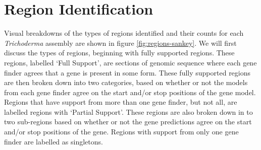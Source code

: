 \section{Region Identification}
\label{section:regions}

Visual breakdowns of the types of regions identified and their counts
for each \textit{Trichoderma} assembly are shown in figure
\ref{fig:regions-sankey}. We will first discuss the types of regions,
beginning with fully supported regions. These regions, labelled `Full
Support', are sections of genomic sequence where each gene finder
agrees that a gene is present in some form. These fully supported
regions are then broken down into two categories, based on whether or
not the models from each gene finder agree on the start and/or stop
positions of the gene model. Regions that have support from more than
one gene finder, but not all, are labelled regions with `Partial
Support'. These regions are also broken down in to two sub-regions
based on whether or not the gene predictions agree on the start and/or
stop positions of the gene. Regions with support from only one gene
finder are labelled as singletons.

